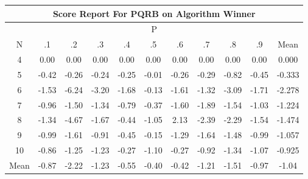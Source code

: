 \documentclass[11pt,a4paper]{report}
\begin{document}
\begin{longtable}{ | c || c | c | c | c | c | c | c | c | c || c |}
\hline
\multicolumn{11}{|c|}{ Score Report For PQRB on Algorithm Winner} \\
\hline
\multicolumn{11}{|c|}{ P } \\
\hline
N & .1 & .2 & .3 & .4 & .5 & .6 & .7 & .8 & .9 & Mean\\
 \hline
 \hline
 \endhead
  4 &  \cellcolor[HTML]{FFFFFF} 0.00 &  \cellcolor[HTML]{FFFFFF} 0.00 &  \cellcolor[HTML]{FFFFFF} 0.00 &  \cellcolor[HTML]{FFFFFF} 0.00 &  \cellcolor[HTML]{FFFFFF} 0.00 &  \cellcolor[HTML]{FFFFFF} 0.00 &  \cellcolor[HTML]{FFFFFF} 0.00 &  \cellcolor[HTML]{FFFFFF} 0.00 &  \cellcolor[HTML]{FFFFFF} 0.00 & 0.000 \\
  5 &  \cellcolor[HTML]{FFF7F7} -0.42 &  \cellcolor[HTML]{FFF7F7} -0.26 &  \cellcolor[HTML]{FFF7F7} -0.24 &  \cellcolor[HTML]{FFF7F7} -0.25 &  \cellcolor[HTML]{FFFFFF} -0.01 &  \cellcolor[HTML]{FFF7F7} -0.26 &  \cellcolor[HTML]{FFF7F7} -0.29 &  \cellcolor[HTML]{FFE7E7} -0.82 &  \cellcolor[HTML]{FFF7F7} -0.45 & -0.333 \\
  6 &  \cellcolor[HTML]{FFD7D7} -1.53 &  \cellcolor[HTML]{FF6060} -6.24 &  \cellcolor[HTML]{FFAFAF} -3.20 &  \cellcolor[HTML]{FFD7D7} -1.68 &  \cellcolor[HTML]{FFFFFF} -0.13 &  \cellcolor[HTML]{FFD7D7} -1.61 &  \cellcolor[HTML]{FFDFDF} -1.32 &  \cellcolor[HTML]{FFAFAF} -3.09 &  \cellcolor[HTML]{FFD7D7} -1.71 & -2.278 \\
  7 &  \cellcolor[HTML]{FFE7E7} -0.96 &  \cellcolor[HTML]{FFD7D7} -1.50 &  \cellcolor[HTML]{FFDFDF} -1.34 &  \cellcolor[HTML]{FFEFEF} -0.79 &  \cellcolor[HTML]{FFF7F7} -0.37 &  \cellcolor[HTML]{FFD7D7} -1.60 &  \cellcolor[HTML]{FFCFCF} -1.89 &  \cellcolor[HTML]{FFD7D7} -1.54 &  \cellcolor[HTML]{FFE7E7} -1.03 & -1.224 \\
  8 &  \cellcolor[HTML]{FFDFDF} -1.34 &  \cellcolor[HTML]{FF8787} -4.67 &  \cellcolor[HTML]{FFD7D7} -1.67 &  \cellcolor[HTML]{FFF7F7} -0.44 &  \cellcolor[HTML]{FFE7E7} -1.05 &  \cellcolor[HTML]{C7C7FF} 2.13 &  \cellcolor[HTML]{FFBFBF} -2.39 &  \cellcolor[HTML]{FFC7C7} -2.29 &  \cellcolor[HTML]{FFD7D7} -1.54 & -1.474 \\
  9 &  \cellcolor[HTML]{FFE7E7} -0.99 &  \cellcolor[HTML]{FFD7D7} -1.61 &  \cellcolor[HTML]{FFE7E7} -0.91 &  \cellcolor[HTML]{FFF7F7} -0.45 &  \cellcolor[HTML]{FFFFFF} -0.15 &  \cellcolor[HTML]{FFDFDF} -1.29 &  \cellcolor[HTML]{FFD7D7} -1.64 &  \cellcolor[HTML]{FFD7D7} -1.48 &  \cellcolor[HTML]{FFE7E7} -0.99 & -1.057 \\
  10 &  \cellcolor[HTML]{FFE7E7} -0.86 &  \cellcolor[HTML]{FFDFDF} -1.25 &  \cellcolor[HTML]{FFDFDF} -1.23 &  \cellcolor[HTML]{FFF7F7} -0.27 &  \cellcolor[HTML]{FFE7E7} -1.10 &  \cellcolor[HTML]{FFF7F7} -0.27 &  \cellcolor[HTML]{FFE7E7} -0.92 &  \cellcolor[HTML]{FFDFDF} -1.34 &  \cellcolor[HTML]{FFE7E7} -1.07 & -0.925 \\
 \hline
 \hline
Mean &  \cellcolor[HTML]{FFE7E7} -0.87 &  \cellcolor[HTML]{FFC7C7} -2.22 &  \cellcolor[HTML]{FFDFDF} -1.23 &  \cellcolor[HTML]{FFEFEF} -0.55 &  \cellcolor[HTML]{FFF7F7} -0.40 &  \cellcolor[HTML]{FFF7F7} -0.42 &  \cellcolor[HTML]{FFDFDF} -1.21 &  \cellcolor[HTML]{FFD7D7} -1.51 &  \cellcolor[HTML]{FFE7E7} -0.97 &  \cellcolor[HTML]{FFE7E7} -1.04
\end{longtable}
\end{document}
